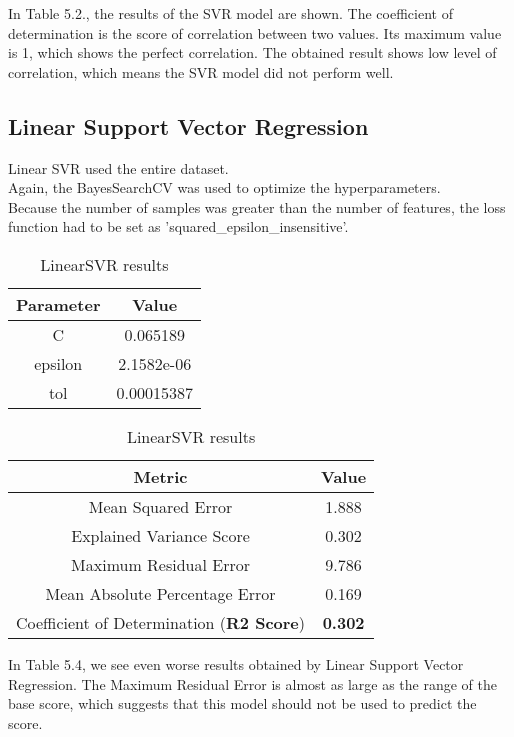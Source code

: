\documentclass[times, utf8, zavrsni, english]{fer}
\begin{document}
In Table 5.2., the results of the SVR model are shown.
The coefficient of determination is the score of correlation between two values. Its maximum value is 1, which shows the perfect correlation.
The obtained result shows low level of correlation, which means the SVR model did not perform well.

\subsection{Linear Support Vector Regression}
Linear SVR used the entire dataset. \\
Again, the BayesSearchCV was used to optimize the hyperparameters.\\
Because the number of samples was greater than the number of features, the loss function had to be set as 'squared\_epsilon\_insensitive'.
\begin{table}[h!]
	\parbox{.45\linewidth}{
		\centering
		\begin{tabular}{|| c | c ||} 
			\hline
			Parameter & Value \\ [0.5ex] 
			\hline\hline
			C & 0.065189  \\ \hline
			epsilon & 2.1582e-06 \\ \hline
			tol & 0.00015387  \\ 
			\hline
		\end{tabular}
		\caption{Hyperparameteres for LinearSVR}
		\label{table:5}
	}
	\parbox{.45\linewidth}{
		\centering
		\begin{tabular}{|| c | c ||} 
			\hline
			Metric & Value \\ [0.5ex] 
			\hline\hline
			Mean Squared Error & 1.888  \\ \hline
			Explained Variance Score & 0.302\\ \hline
			Maximum Residual Error & 9.786 \\ \hline
			Mean Absolute Percentage Error & 0.169 \\ \hline
			Coefficient of Determination (\textbf{R2 Score}) & \textbf{0.302} \\
			\hline
		\end{tabular}
		\caption{LinearSVR results}
		\label{table:6}
	}
\end{table}

In Table 5.4, we see even worse results obtained by Linear Support Vector Regression.
The Maximum Residual Error is almost as large as the range of the base score, which suggests that this model should not be used to predict the score.
\end{document}
